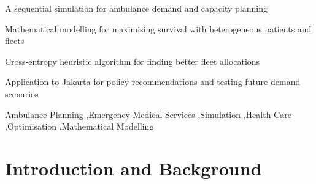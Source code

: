 \documentclass[preprint,12pt]{elsarticle}
\begin{document}
\begin{frontmatter}
\begin{abstract}
\end{abstract}


\begin{highlights} \item A sequential simulation for ambulance demand and
    capacity planning \item Mathematical modelling for maximising survival with
    heterogeneous patients and fleets \item Cross-entropy heuristic algorithm
        for finding better fleet allocations \item Application to Jakarta for
            policy recommendations and testing future demand scenarios
\end{highlights}

\begin{keyword}
Ambulance Planning \sep Emergency Medical Services \sep Simulation \sep Health
Care \sep Optimisation \sep Mathematical Modelling \end{keyword}

\end{frontmatter}


\newpage


\section{Introduction and Background}
\end{document}
